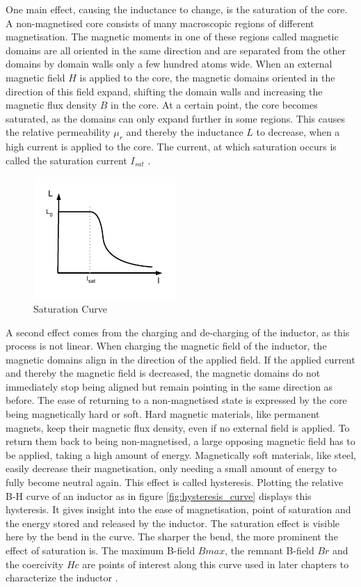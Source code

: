 One main effect, causing the inductance to change, is the saturation of the core. A non-magnetised core consists of many macroscopic regions of different magnetisation. The magnetic moments in one of these regions called magnetic domains are all oriented in the same direction and are separated from the other domains by domain walls only a few hundred atoms wide. When an external magnetic field $H$ is applied to the core, the magnetic domains oriented in the direction of this field expand, shifting the domain walls and increasing the magnetic flux density $B$ in the core. At a certain point, the core becomes saturated, as the domains can only expand further in some regions. This causes the relative permeability $\mu_r$ and thereby the inductance $L$ to decrease, when a high current is applied to the core. The current, at which saturation occurs is called the saturation current $I_{sat}$ \cite{winklerDirectModelingInductor2019, hungarian_book}.
\begin{figure}[H]
    \centering
    \includegraphics[width=.4\linewidth]{Bilder/Kapitel2/Saturation_Drawn.pdf}
    \caption{Saturation Curve}
    \label{fig:saturation_curve}
\end{figure}
A second effect comes from the charging and de-charging of the inductor, as this process is not linear. When charging the magnetic field of the inductor, the magnetic domains align in the direction of the applied field. If the applied current and thereby the magnetic field is decreased, the magnetic domains do not immediately stop being aligned but remain pointing in the same direction as before. The ease of returning to a non-magnetised state is expressed by the core being magnetically hard or soft. Hard magnetic materials, like permanent magnets, keep their magnetic flux density, even if no external field is applied. To return them back to being non-magnetised, a large opposing magnetic field has to be applied, taking a high amount of energy. Magnetically soft materials, like steel, easily decrease their magnetisation, only needing a small amount of energy to fully become neutral again. 
This effect is called hysteresis. Plotting the relative B-H curve of an inductor as in figure \ref{fig:hysteresis_curve} displays this hysteresis. It gives insight into the ease of magnetisation, point of saturation and the energy stored and released by the inductor. The saturation effect is visible here by the bend in the curve. The sharper the bend, the more prominent the effect of saturation is. The maximum B-field $Bmax$, the remnant B-field $Br$ and the coercivity $Hc$ are points of interest along this curve used in later chapters to characterize the inductor \cite{encyclopedia_magnetica,leeHysteresisEffectInduces2021}.
